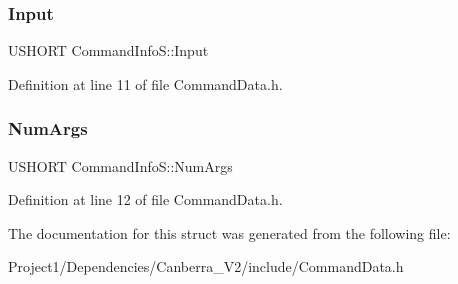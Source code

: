 \subsubsection{\texorpdfstring{Input}{Input}}
{\footnotesize\ttfamily U\+S\+H\+O\+RT Command\+Info\+S\+::\+Input}



Definition at line 11 of file Command\+Data.\+h.

\mbox{\label{struct_command_info_s_a4a20f7982a7609ee531c5cbbdd85dc70}} 
\subsubsection{\texorpdfstring{Num\+Args}{NumArgs}}
{\footnotesize\ttfamily U\+S\+H\+O\+RT Command\+Info\+S\+::\+Num\+Args}



Definition at line 12 of file Command\+Data.\+h.



The documentation for this struct was generated from the following file\+:\begin{DoxyCompactItemize}
\item 
Project1/\+Dependencies/\+Canberra\+\_\+\+V2/include/Command\+Data.\+h\end{DoxyCompactItemize}
